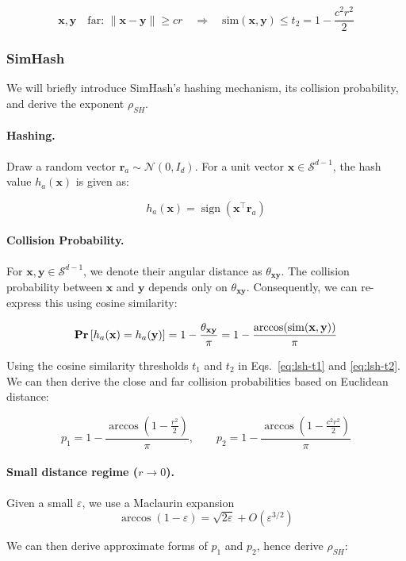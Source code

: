 \documentclass{article}
\newcommand{\bx}{\mathbf{x}}
\newcommand{\by}{\mathbf{y}}
\newcommand{\br}{\mathbf{r}}
\newcommand{\cosim}{\mathrm{sim}}
\newcommand{\mN}{\mathcal{N}}
\newcommand{\mSd}{\mathcal{S}^{d-1}}
\renewcommand{\Pr}[1]{\textrm{\bf Pr}\left[#1\right]}
\begin{document}
\begin{equation}
    \label{eq:lsh-t2}
    \bx, \by \quad \text{far: } \|\bx-\by\| \ge cr
    \quad\Rightarrow\quad \cosim(\bx, \by) \leq t_2 = 1 - \frac{ c^2r^2}{2}
\end{equation}

\subsubsection{SimHash}
\label{sec:simhash}

We will briefly introduce SimHash's hashing mechanism, its collision probability, and derive the exponent $\rho_{SH}$. 

\paragraph{Hashing.} Draw a random vector $\br_a \sim \mN(0,I_d)$. For a unit vector $\bx \in \mSd$, the hash value $h_a(\bx)$ is given as:

\[
h_a(\bx) = \operatorname{sign}( \bx^\top \br_a)
\]

\paragraph{Collision Probability.}  For $\bx, \by \in \mSd$, we denote their angular distance as $\theta_{\bx \by}$. The collision probability between $\bx$ and $\by$ depends only on $\theta_{\bx \by}$. Consequently, we can re-express this using cosine similarity:

\[
\Pr{h_a(\bx)=h_a(\by)}
=
1 - \frac{\theta_{\bx \by}}{\pi}
=
1 - \frac{\arccos(\cosim(\bx, \by))}{\pi}
\]

Using the cosine similarity thresholds $t_1$ and $t_2$ in Eqs.~\ref{eq:lsh-t1} and \ref{eq:lsh-t2}. We can then derive the close and far collision probabilities based on Euclidean distance:

\[
p_1 = 1 - \frac{\arccos\!\left(1-\frac{r^2}{2}\right)}{\pi},
\qquad
p_2 = 1 - \frac{\arccos\!\left(1-\frac{c^2 r^2}{2}\right)}{\pi}
\]

\paragraph{Small distance regime ($r \to 0$).} Given a small $\varepsilon$, we use a Maclaurin expansion
\[
\arccos(1-\varepsilon)
=
\sqrt{2\varepsilon}
+ O(\varepsilon^{3/2})
\]

We can then derive approximate forms of $p_1$ and $p_2$, hence derive $\rho_{SH}$: 
\end{document}
